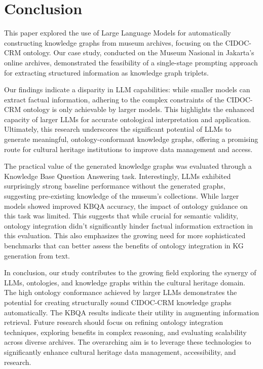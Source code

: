 \documentclass[a4, conference]{IEEEtran}
\begin{document}
\section{Conclusion}

This paper explored the use of Large Language Models for automatically constructing knowledge graphs from museum archives, focusing on the CIDOC-CRM ontology. Our case study, conducted on the Museum Nasional in Jakarta's online archives, demonstrated the feasibility of a single-stage prompting approach for extracting structured information as knowledge graph triplets.

Our findings indicate a disparity in LLM capabilities: while smaller models can extract factual information, adhering to the complex constraints of the CIDOC-CRM ontology is only achievable by larger models. This highlights the enhanced capacity of larger LLMs for accurate ontological interpretation and application. Ultimately, this research underscores the significant potential of LLMs to generate meaningful, ontology-conformant knowledge graphs, offering a promising route for cultural heritage institutions to improve data management and access.

The practical value of the generated knowledge graphs was evaluated through a Knowledge Base Question Answering task. Interestingly, LLMs exhibited surprisingly strong baseline performance without the generated graphs, suggesting pre-existing knowledge of the museum's collections. While larger models showed improved KBQA accuracy, the impact of ontology guidance on this task was limited. This suggests that while crucial for semantic validity, ontology integration didn't significantly hinder factual information extraction in this evaluation. This also emphasizes the growing need for more sophisticated benchmarks that can better assess the benefits of ontology integration in KG generation from text.

In conclusion, our study contributes to the growing field exploring the synergy of LLMs, ontologies, and knowledge graphs within the cultural heritage domain. The high ontology conformance achieved by larger LLMs demonstrates the potential for creating structurally sound CIDOC-CRM knowledge graphs automatically. The KBQA results indicate their utility in augmenting information retrieval. Future research should focus on refining ontology integration techniques, exploring benefits in complex reasoning, and evaluating scalability across diverse archives. The overarching aim is to leverage these technologies to significantly enhance cultural heritage data management, accessibility, and research.




\end{document}
